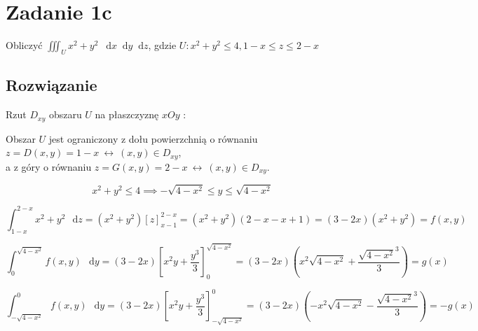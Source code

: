 \documentclass{article}
\newcommand{\diff}{\mathop{}\!\mathrm{d}}
\newcommand{\for}{\ \leftrightarrow\ }
\newcommand{\Integral}[4]{\int_{#1}^{#2} \! #3 \, \mathop{}\!\mathrm{d}#4}
\DeclareMathOperator{\?}{?}
\begin{document}
\section*{Zadanie 1c}

Obliczyć $\displaystyle \iiint_U x^2 + y^2 \ \diff{x}\diff{y}\diff{z}$, gdzie
$U: x^2 + y^2  \le 4, 1-x \le z \le 2-x$

\subsection*{Rozwiązanie}

Rzut $D_{xy}$ obszaru $U$ na płaszczyznę $xOy$ :
\begin{figure}[h!]
   \centering
\end{figure}

\noindent Obszar $U$ jest ograniczony z dołu powierzchnią o równaniu
$z = D(x,y) = 1-x \for (x,y) \in D_{xy}$, \\
a z góry o równaniu $z = G(x,y) = 2-x \for (x,y) \in D_{xy}$.

\begin{equation*}
   x^2 + y^2 \le 4 \implies -\sqrt{4-x^2} \le y \le \sqrt{4-x^2}
\end{equation*}

\begin{equation*}
   \Integral{1-x}{2-x}{x^2 + y^2}{z} = (x^2 + y^2)[z]_{x-1}^{2-x} = (x^2+y^2)(2-x-x+1) = (3-2x)(x^2+y^2) = f(x,y)
\end{equation*}

\begin{equation*}
   \Integral{0}{\sqrt{4-x^2}}{f(x,y)}{y} =
   (3-2x)\left[x^2 y + \frac{y^3}{3} \right]_0^{\sqrt{4-x^2}} =
   (3-2x)\left(x^2\sqrt{4-x^2} + \frac{\sqrt{4-x^2}^3}{3} \right) = g(x)
\end{equation*}

\begin{equation*}
   \Integral{-\sqrt{4-x^2}}{0}{f(x,y)}{y} =
   (3-2x)\left[x^2 y + \frac{y^3}{3} \right]_{-\sqrt{4-x^2}}^0 =
   (3-2x)\left(-x^2\sqrt{4-x^2} - \frac{\sqrt{4-x^2}^3}{3} \right) = -g(x)
\end{equation*}
\end{document}

